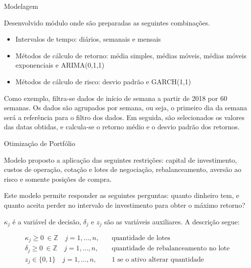     \begin{frame}{Modelagem}

        \Large

        Desenvolvido módulo onde são preparadas as seguintes combinações.

        \begin{itemize}
            \item Intervalos de tempo: diários, semanais e mensais
            \item Métodos de cálculo de retorno: média simples, médias móveis, médias móveis exponenciais e ARIMA(0,1,1)
            \item Métodos de cálculo de risco: desvio padrão e GARCH(1,1)
        \end{itemize}

        Como exemplo, filtra-se dados de início de semana a partir de 2018 por 60 semanas. Os dados são agrupados por semana, ou seja, o primeiro dia da semana será a referência para o filtro dos dados. Em seguida, são selecionados os valores das datas obtidas, e calcula-se o retorno médio e o desvio padrão dos retornos.
        
    \end{frame}




    \begin{frame}{Otimização de Portfólio}

        \Large

        Modelo proposto a aplicação das seguintes restrições: capital de investimento, custos de operação, cotação e lotes de negociação, rebalanceamento, aversão ao risco e somente posições de compra. 
        
        Este modelo permite responder as seguintes perguntas: quanto dinheiro tem, e quanto aceita perder no intervalo de investimento para obter o máximo retorno?
        
        $\kappa_{j}$ é a variável de decisão, $\delta_{j}$ e $z_{j}$ são as variáveis auxiliares. A descrição segue:
        
        \begin{equation*}
            \begin{aligned}
                \kappa_{j}  \geq 0 \ \in \mathbb{Z} \quad j=1, \ldots, n , \quad & \text{quantidade de lotes} \\
                \delta_{j}  \geq 0 \ \in \mathbb{Z} \quad j=1, \ldots, n , \quad & \text{quantidade de rebalanceamento no lote} \\
                z_{j} \in\{0,1\} \quad j=1, \ldots, n, \quad & \text{1 se o ativo alterar quantidade}
            \end{aligned}
        \end{equation*}

    \end{frame}





